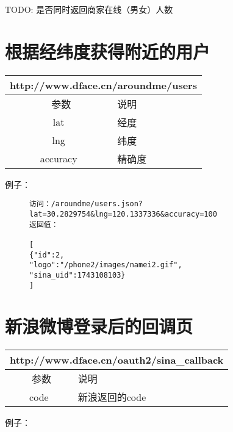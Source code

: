 \documentclass[cs4size]{ctexartutf8}
\begin{document}
TODO: 是否同时返回商家在线（男女）人数




\section{根据经纬度获得附近的用户}

\begin{table}[H]
   \begin{center}
\begin{tabular}{|c|p{12cm}|}
\hline
\multicolumn{2}{|c|}{http://www.dface.cn/aroundme/users} \\
\hline\hline
 \  参数  &  说明  \\
\hline
 lat  &  经度\\
\hline
 lng  &  纬度\\ 
\hline
 accuracy  &  精确度\\ 
\hline
\end{tabular}
   \end{center}
\end{table}


例子：

\begin{figure}[H]
\begin{verbatim}
访问：/aroundme/users.json?lat=30.2829754&lng=120.1337336&accuracy=100
返回值：

[
{"id":2,
"logo":"/phone2/images/namei2.gif",
"sina_uid":1743108103}
]

\end{verbatim}
\end{figure}


\section{新浪微博登录后的回调页}

\begin{table}[H]
   \begin{center}
\begin{tabular}{|c|p{12cm}|}
\hline
\multicolumn{2}{|c|}{http://www.dface.cn/oauth2/sina\_callback} \\
\hline\hline
 \  参数  &  说明  \\
\hline
 code  &  新浪返回的code\\
\hline
\end{tabular}
   \end{center}
\end{table}


例子：
\end{document}
